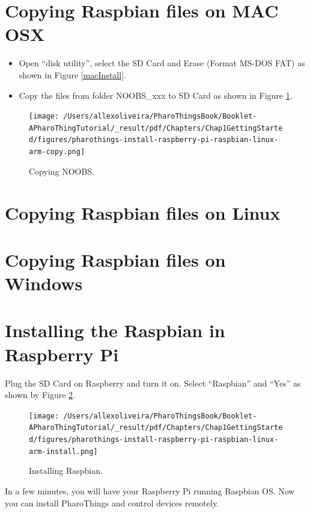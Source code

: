 \documentclass[10pt,twoside,english]{_support/latex/sbabook/sbabook}
\begin{document}
\section{Copying Raspbian files on MAC OSX}
\begin{itemize}
\item Open “disk utility”, select the SD Card and Erase (Format MS-DOS FAT) as shown in Figure \ref{macInstall}.
\item Copy the files from folder NOOBS\_xxx to SD Card as shown in Figure \ref{macCopy}.
\end{itemize}


\begin{figure}

\begin{center}
\texttt{[image: /Users/allexoliveira/PharoThingsBook/Booklet-APharoThingTutorial/\_result/pdf/Chapters/Chap1GettingStarted/figures/pharothings-install-raspberry-pi-raspbian-linux-arm-copy.png]}\caption{Copying NOOBS.\label{macCopy}}\end{center}
\end{figure}

\section{Copying Raspbian files on Linux}\section{Copying Raspbian files on Windows}\section{Installing the Raspbian in Raspberry Pi}
Plug the SD Card on Raspberry and turn it on. Select “Raspbian” and “Yes” as shown by Figure \ref{install}.


\begin{figure}

\begin{center}
\texttt{[image: /Users/allexoliveira/PharoThingsBook/Booklet-APharoThingTutorial/\_result/pdf/Chapters/Chap1GettingStarted/figures/pharothings-install-raspberry-pi-raspbian-linux-arm-install.png]}\caption{Installing Raspbian.\label{install}}\end{center}
\end{figure}


In a few minutes, you will have your Raspberry Pi running Raspbian OS.
Now you can install PharoThings and control devices remotely. 
\end{document}
